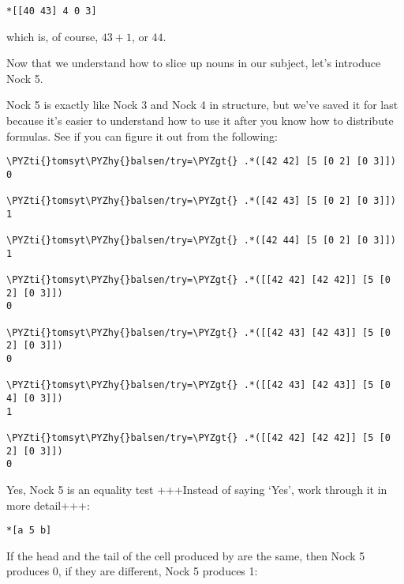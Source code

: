 \begin{framed_shaded}
\begin{Verbatim}[fontsize=\relsize{-2.5},commandchars=\\\{\}]
*[[40 43] 4 0 3]
\end{Verbatim}
\end{framed_shaded}
which is, of course, \(43 + 1\), or \(44\).

Now that we understand how to slice up nouns in our subject, let's introduce Nock 5.

Nock 5 is exactly like Nock 3 and Nock 4 in structure, but we've saved it for
last because it's easier to understand how to use it after you know how to
distribute formulas. See if you can figure it out from the following:

\begin{framed_shaded}
\begin{Verbatim}[fontsize=\relsize{-2.5},commandchars=\\\{\}]
\PYZti{}tomsyt\PYZhy{}balsen/try=\PYZgt{} .*([42 42] [5 [0 2] [0 3]])
0

\PYZti{}tomsyt\PYZhy{}balsen/try=\PYZgt{} .*([42 43] [5 [0 2] [0 3]])
1

\PYZti{}tomsyt\PYZhy{}balsen/try=\PYZgt{} .*([42 44] [5 [0 2] [0 3]])
1

\PYZti{}tomsyt\PYZhy{}balsen/try=\PYZgt{} .*([[42 42] [42 42]] [5 [0 2] [0 3]])
0

\PYZti{}tomsyt\PYZhy{}balsen/try=\PYZgt{} .*([[42 43] [42 43]] [5 [0 2] [0 3]])
0

\PYZti{}tomsyt\PYZhy{}balsen/try=\PYZgt{} .*([[42 43] [42 43]] [5 [0 4] [0 3]])
1

\PYZti{}tomsyt\PYZhy{}balsen/try=\PYZgt{} .*([[42 42] [42 42]] [5 [0 2] [0 3]])
0
\end{Verbatim}
\end{framed_shaded}

Yes, Nock 5 is an equality test +++Instead of saying `Yes', work through it in more detail+++:

\begin{framed_shaded}
\begin{Verbatim}[fontsize=\relsize{-2.5},commandchars=\\\{\}]
*[a 5 b]
\end{Verbatim}
\end{framed_shaded}
If the head and the tail of the cell produced by \kode{*[a b]} are the same, then
Nock 5 produces 0, if they are different, Nock 5 produces 1:

